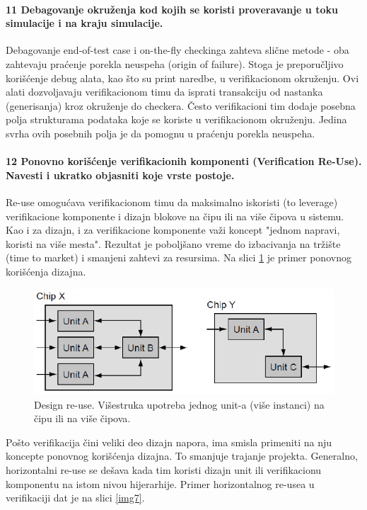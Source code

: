 \documentclass[a4paper, 12pt]{article}
\begin{document}
\paragraph{11 Debagovanje okruženja kod kojih se koristi proveravanje u toku simulacije i na kraju simulacije.}
\hfill \break
\indent Debagovanje end-of-test case i on-the-fly checkinga zahteva slične metode - oba zahtevaju praćenje porekla neuspeha (origin of failure). Stoga je preporučljivo korišćenje debug alata, kao što su print naredbe, u verifikacionom okruženju. Ovi alati dozvoljavaju verifikacionom timu da isprati transakciju od nastanka (generisanja) kroz okruženje do checkera. Često verifikacioni tim dodaje posebna polja strukturama podataka koje se koriste u verifikacionom okruženju. Jedina svrha ovih posebnih polja je da pomognu u praćenju porekla neuspeha.
\paragraph{12 Ponovno korišćenje verifikacionih komponenti (Verification Re-Use). Navesti i ukratko objasniti koje vrste postoje.}
\hfill \break
\indent Re-use omogućava verifikacionom timu da maksimalno iskoristi (to leverage) verifikacione komponente i dizajn blokove na čipu ili na više čipova u sistemu. Kao i za dizajn, i za verifikacione komponente važi koncept "jednom napravi, koristi na više mesta". Rezultat je poboljšano vreme do izbacivanja na tržište (time to market) i smanjeni zahtevi za resursima. Na slici \ref{img6} je primer ponovnog korišćenja dizajna.\\
\begin{figure}[h!]
\centering
\includegraphics[scale=0.5]{img6.png}
\caption{Design re-use. Višestruka upotreba jednog unit-a (više instanci) na čipu ili na više čipova.}
\label{img6}
\end{figure}
\indent Pošto verifikacija čini veliki deo dizajn napora, ima smisla primeniti na nju koncepte ponovnog korišćenja dizajna. To smanjuje trajanje projekta. Generalno, horizontalni re-use se dešava kada tim koristi dizajn unit ili verifikacionu komponentu na istom nivou hijerarhije. Primer horizontalnog re-usea u verifikaciji dat je na slici \ref{img7}.\\
\end{document}
